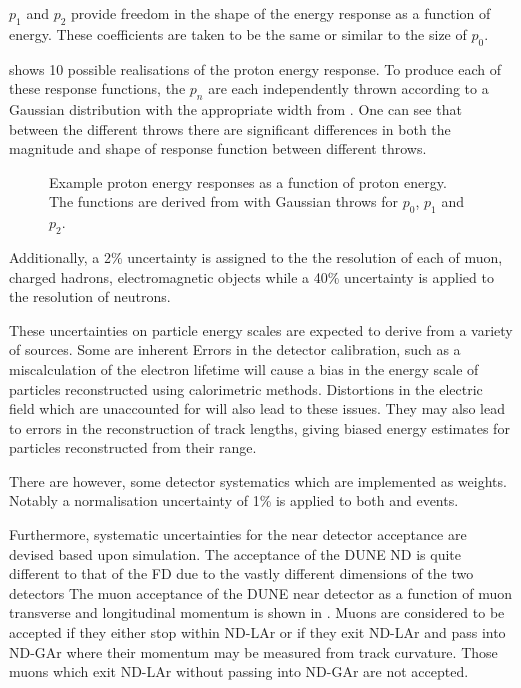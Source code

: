 $p_{1}$ and $p_{2}$ provide freedom in the shape of the energy response as a function of energy.
These coefficients are taken to be the same or similar to the size of $p_{0}$.

 shows 10 possible realisations of the proton energy response.
To produce each of these response functions, the $p_{n}$ are each independently thrown according to a Gaussian distribution with the appropriate width from .
One can see that between the different throws there are significant differences in both the magnitude and shape of response function between different throws.

\begin{figure}[h]
	\begin{adjustbox}{max totalsize=.6\textwidth, center}
		
	\end{adjustbox}
	\caption[Example proton energy responses as a function of proton energy.]{Example proton energy responses as a function of proton energy. The functions are derived from  with Gaussian throws for $p_{0}$, $p_{1}$ and $p_{2}$.}
	\label{fig:protonEScale}
\end{figure}

Additionally, a 2\% uncertainty is assigned to the the resolution of each of muon, charged hadrons, electromagnetic objects while a 40\% uncertainty is applied to the resolution of neutrons.

These uncertainties on particle energy scales are expected to derive from a variety of sources.
Some are inherent
Errors in the detector calibration, such as a miscalculation of the electron lifetime will cause a bias in the energy scale of particles reconstructed using calorimetric methods.
Distortions in the electric field which are unaccounted for will also lead to these issues. 
They may also lead to errors in the reconstruction of track lengths, giving biased energy estimates for particles reconstructed from their range.

There are however, some detector systematics which are implemented as weights. 
Notably a normalisation uncertainty of 1\% is applied to both \numu and \nue events.

Furthermore, systematic uncertainties for the near detector acceptance are devised based upon simulation.
The acceptance of the DUNE ND is quite different to that of the FD due to the vastly different dimensions of the two detectors
The muon acceptance of the DUNE near detector as a function of muon transverse and longitudinal momentum is shown in . 
Muons are considered to be accepted if they either stop within ND-LAr or if they exit ND-LAr and pass into ND-GAr where their momentum may be measured from track curvature.
Those muons which exit ND-LAr without passing into ND-GAr are not accepted.


